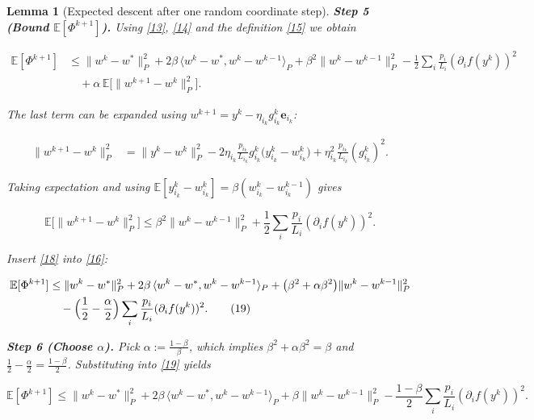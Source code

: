 \documentclass{article}
\newtheorem{lemma}{Lemma}
\newcommand{\E}{\mathbb{E}}
\newcommand{\ip}[2]{\langle #1,#2\rangle}
\newcommand{\be}{\mathbf{e}}
\begin{document}
\begin{lemma}[Expected descent after one random coordinate step]
\medskip
\noindent\textbf{Step 5 (Bound $\E[\Phi^{k+1}]$).}
Using \eqref{13}, \eqref{14} and the definition \eqref{15} we obtain

\begin{align}
\E[\Phi^{k+1}]
&\le \|w^{k}-w^{*}\|_{P}^{2}
   +2\beta\,\ip{w^{k}-w^{*}}{w^{k}-w^{k-1}}_{P}
   +\beta^{2}\|w^{k}-w^{k-1}\|_{P}^{2}
   -\frac{1}{2}\sum_{i}\frac{p_{i}}{L_{i}}
        (\partial_{i}f(y^{k}))^{2}                              \nonumber\\
&\quad +\alpha\,
   \E\!\bigl[\|w^{k+1}-w^{k}\|_{P}^{2}\bigr].                 \tag{16}
\end{align}

The last term can be expanded using $w^{k+1}=y^{k}-\eta_{i_{k}}g^{k}_{i_{k}}\be_{i_{k}}$:

\begin{align}
\|w^{k+1}-w^{k}\|_{P}^{2}
&=\|y^{k}-w^{k}\|_{P}^{2}
   -2\eta_{i_{k}}\frac{p_{i_{k}}}{L_{i_{k}}}
        g^{k}_{i_{k}}\bigl(y^{k}_{i_{k}}-w^{k}_{i_{k}}\bigr)
   +\eta_{i_{k}}^{2}\frac{p_{i_{k}}}{L_{i_{k}}}
        (g^{k}_{i_{k}})^{2}.                                 \tag{17}
\end{align}

Taking expectation and using $\E[y^{k}_{i_{k}}-w^{k}_{i_{k}}]=\beta (w^{k}_{i_{k}}-w^{k-1}_{i_{k}})$
gives

\[
\E\!\bigl[\|w^{k+1}-w^{k}\|_{P}^{2}\bigr]
\le \beta^{2}\|w^{k}-w^{k-1}\|_{P}^{2}
    +\frac{1}{2}\sum_{i}\frac{p_{i}}{L_{i}}
          (\partial_{i}f(y^{k}))^{2}.                         \tag{18}
\]

Insert \eqref{18} into \eqref{16}:

\begin{align}
\E[\Phi^{k+1}]
&\le \|w^{k}-w^{*}\|_{P}^{2}
   +2\beta\,\ip{w^{k}-w^{*}}{w^{k}-w^{k-1}}_{P}
   +\bigl(\beta^{2}+\alpha\beta^{2}\bigr)
        \|w^{k}-w^{k-1}\|_{P}^{2}                           \nonumber\\
&\quad -\Bigl(\frac12-\frac{\alpha}{2}\Bigr)
        \sum_{i}\frac{p_{i}}{L_{i}}
        (\partial_{i}f(y^{k}))^{2}.                         \tag{19}
\end{align}

\medskip
\noindent\textbf{Step 6 (Choose $\alpha$).}
Pick $\alpha:=\frac{1-\beta}{\beta}$, which implies
$\beta^{2}+\alpha\beta^{2}= \beta$ and $ \frac12-\frac{\alpha}{2}
= \frac{1-\beta}{2}$.  Substituting into \eqref{19} yields

\[
\E[\Phi^{k+1}]
\le \|w^{k}-w^{*}\|_{P}^{2}
   +2\beta\,\ip{w^{k}-w^{*}}{w^{k}-w^{k-1}}_{P}
   +\beta\|w^{k}-w^{k-1}\|_{P}^{2}
   -\frac{1-\beta}{2}
        \sum_{i}\frac{p_{i}}{L_{i}}
        (\partial_{i}f(y^{k}))^{2}.                         \tag{20}
\]


\end{lemma}
\end{document}
